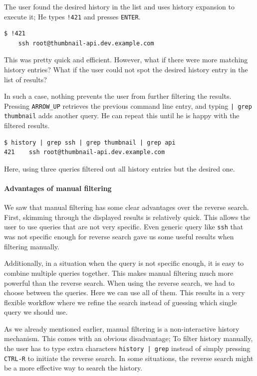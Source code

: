 The user found the desired history in the list and uses history expansion to execute it; He types \verb|!421| and presses \verb|ENTER|.

\begin{verbatim}
$ !421
    ssh root@thumbnail-api.dev.example.com
\end{verbatim}

This was pretty quick and efficient. However, what if there were more matching history entries? What if the user could not spot the desired history entry in the list of results?

In such a case, nothing prevents the user from further filtering the results. Pressing \verb|ARROW_UP| retrieves the previous command line entry, and typing \verb#| grep thumbnail# adds another query. He can repeat this until he is happy with the filtered results.

\begin{verbatim}
$ history | grep ssh | grep thumbnail | grep api
421    ssh root@thumbnail-api.dev.example.com
\end{verbatim}

Here, using three queries filtered out all history entries but the desired one.

\paragraph{Advantages of manual filtering}

We saw that manual filtering has some clear advantages over the reverse search.
First, skimming through the displayed results is relatively quick. This allows the user to use queries that are not very specific.
Even generic query like \verb|ssh| that was not specific enough for reverse search gave us some useful results when filtering manually.

Additionally, in a situation when the query is not specific enough, it is easy to combine multiple queries together. This makes manual filtering much more powerful than the reverse search. 
When using the reverse search, we had to choose between the queries. Here we can use all of them. This results in a very flexible workflow where we refine the search instead of guessing which single query we should use.


As we already mentioned earlier, manual filtering is a non-interactive history mechanism. This comes with an obvious disadvantage; To filter history manually, the user has to type extra characters \verb#history | grep# instead of simply pressing \verb|CTRL-R| to initiate the reverse search. In some situations, the reverse search might be a more effective way to search the history.




